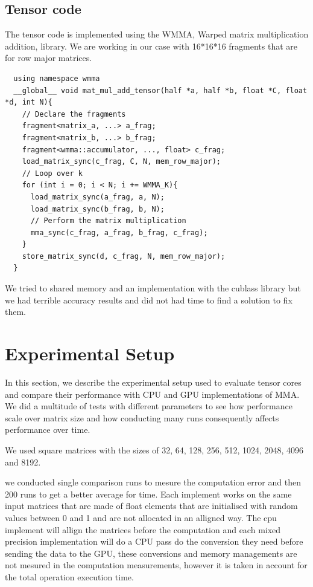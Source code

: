 \documentclass[conference]{IEEEtran}
\begin{document}
  
  \subsection{Tensor code}\label{sec:TensorCode}
  The tensor code is implemented using the WMMA,  Warped matrix multiplication addition,
  library. We are working in our case with 16*16*16 fragments that are for row major matrices.
  \begin{lstlisting}
  using namespace wmma
  __global__ void mat_mul_add_tensor(half *a, half *b, float *C, float *d, int N){
    // Declare the fragments
    fragment<matrix_a, ...> a_frag;
    fragment<matrix_b, ...> b_frag;
    fragment<wmma::accumulator, ..., float> c_frag;
    load_matrix_sync(c_frag, C, N, mem_row_major);
    // Loop over k
    for (int i = 0; i < N; i += WMMA_K){
      load_matrix_sync(a_frag, a, N);
      load_matrix_sync(b_frag, b, N);
      // Perform the matrix multiplication
      mma_sync(c_frag, a_frag, b_frag, c_frag);
    }
    store_matrix_sync(d, c_frag, N, mem_row_major);
  }
  \end{lstlisting}

  We tried to shared memory and an implementation with the cublass library but we had terrible 
  accuracy results and did not had time to find a solution to fix them. 

  \section{Experimental Setup}\label{sec:experimental-setup}
  
  In this section, we describe the experimental setup used to evaluate 
  tensor cores and compare their performance with CPU and GPU implementations of MMA.
  We did a multitude of tests with different parameters to see how performance scale over matrix size
  and how conducting many runs consequently affects performance over time.

  We used square matrices with the sizes of 32, 64, 128, 256, 512, 1024, 2048, 4096 and 8192.

  we conducted single comparison runs to mesure the computation error and then 200 runs to get a better average for time.
  Each implement works on the same input matrices that are made of float elements that are initialised with random values between 0 and 1
  and are not allocated in an alligned way. The cpu implement will allign the matrices before the computation and each mixed precision implementation will do a CPU pass do the conversion they need
  before sending the data to the GPU, these conversions and memory managements are not mesured in the computation 
  measurements, however it is taken in account for the total operation execution time.
\end{document}
